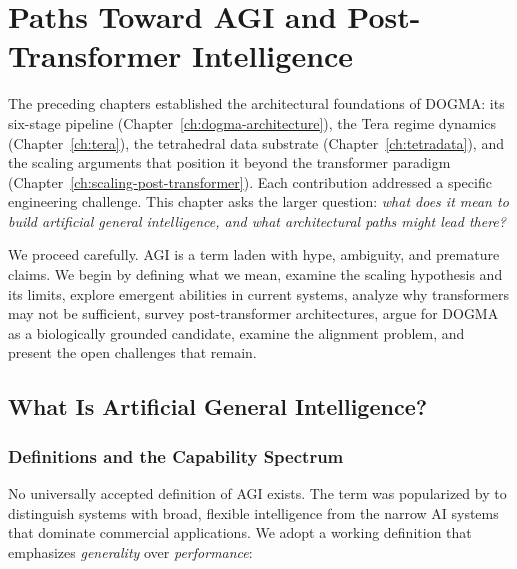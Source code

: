 
\chapter{Paths Toward AGI and Post-Transformer Intelligence}
\label{ch:agi-paths}


\noindent
The preceding chapters established the architectural foundations of DOGMA: its six-stage pipeline (Chapter~\ref{ch:dogma-architecture}), the Tera regime dynamics (Chapter~\ref{ch:tera}), the tetrahedral data substrate (Chapter~\ref{ch:tetradata}), and the scaling arguments that position it beyond the transformer paradigm (Chapter~\ref{ch:scaling-post-transformer}). Each contribution addressed a specific engineering challenge. This chapter asks the larger question: \emph{what does it mean to build artificial general intelligence, and what architectural paths might lead there?}

We proceed carefully. AGI is a term laden with hype, ambiguity, and premature claims. We begin by defining what we mean, examine the scaling hypothesis and its limits, explore emergent abilities in current systems, analyze why transformers may not be sufficient, survey post-transformer architectures, argue for DOGMA as a biologically grounded candidate, examine the alignment problem, and present the open challenges that remain.

\section{What Is Artificial General Intelligence?}
\label{sec:what-is-agi}

\subsection{Definitions and the Capability Spectrum}

No universally accepted definition of AGI exists. The term was popularized by \citet{goertzel2014} to distinguish systems with broad, flexible intelligence from the narrow AI systems that dominate commercial applications. We adopt a working definition that emphasizes \emph{generality} over \emph{performance}:

